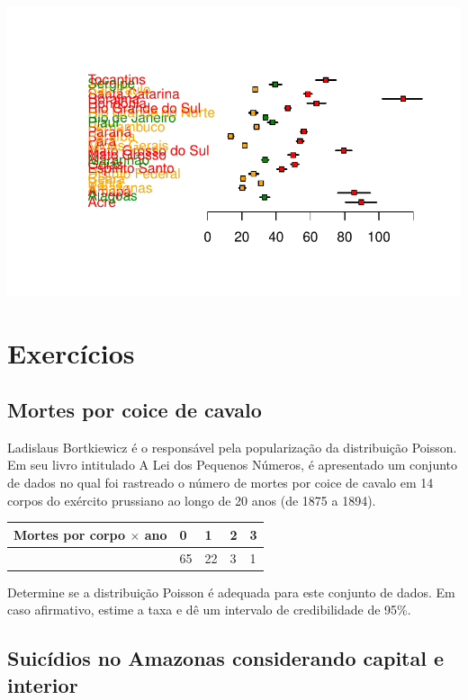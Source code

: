 \documentclass[
  letterpaper,
  DIV=11,
  numbers=noendperiod]{scrreprt}
\theoremstyle{definition}
\theoremstyle{plain}
\theoremstyle{definition}
\theoremstyle{remark}
\begin{document}
\includegraphics{poisson_files/figure-pdf/unnamed-chunk-9-1.pdf}

\section{Exercícios}\label{exercuxedcios-3}

\subsection{Mortes por coice de
cavalo}\label{mortes-por-coice-de-cavalo-1}

Ladislaus Bortkiewicz é o responsável pela popularização da distribuição
Poisson. Em seu livro intitulado A Lei dos Pequenos Números, é
apresentado um conjunto de dados no qual foi rastreado o número de
mortes por coice de cavalo em 14 corpos do exército prussiano ao longo
de 20 anos (de 1875 a 1894).

\begin{longtable}[]{@{}lllll@{}}
\toprule\noalign{}
Mortes por corpo \(\times\) ano & 0 & 1 & 2 & 3 \\
\midrule\noalign{}
\endhead
\bottomrule\noalign{}
\endlastfoot
109 & 65 & 22 & 3 & 1 \\
\end{longtable}

Determine se a distribuição Poisson é adequada para este conjunto de
dados. Em caso afirmativo, estime a taxa e dê um intervalo de
credibilidade de 95\%.

\subsection{Suicídios no Amazonas considerando capital e
interior}\label{suicuxeddios-no-amazonas-considerando-capital-e-interior-1}
\end{document}
